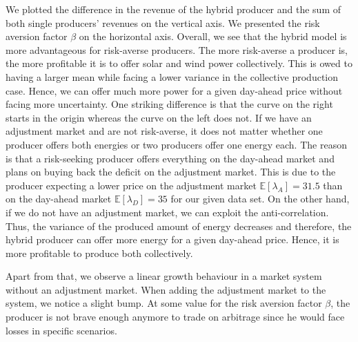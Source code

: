 We plotted the difference in the revenue of the hybrid producer and the sum of both single producers' revenues on the vertical axis. We presented the risk aversion factor $\beta$ on the horizontal axis. Overall, we see that the hybrid model is more advantageous for risk-averse producers. The more risk-averse a producer is, the more profitable it is to offer solar and wind power collectively. This is owed to having a larger mean while facing a lower variance in the collective production case. Hence, we can offer much more power for a given day-ahead price without facing more uncertainty. One striking difference is that the curve on the right starts in the origin whereas the curve on the left does not. If we have an adjustment market and are not risk-averse, it does not matter whether one producer offers both energies or two producers offer one energy each. The reason is that a risk-seeking producer offers everything on the day-ahead market and plans on buying back the deficit on the adjustment market. This is due to the producer expecting a lower price on the adjustment market $\mathbb{E}[\lambda_A]=31.5$ than on the day-ahead market $\mathbb{E}[\lambda_D]=35$ for our given data set.
On the other hand, if we do not have an adjustment market, we can exploit the anti-correlation. Thus, the variance of the produced amount of energy decreases and therefore, the hybrid producer can offer more energy for a given day-ahead price. Hence, it is more profitable to produce both collectively. 

Apart from that, we observe a linear growth behaviour in a market system without an adjustment market. When adding the adjustment market to the system, we notice a slight bump. At some value for the risk aversion factor $\beta$, the producer is not brave enough anymore to trade on arbitrage since he would face losses in specific scenarios. 

